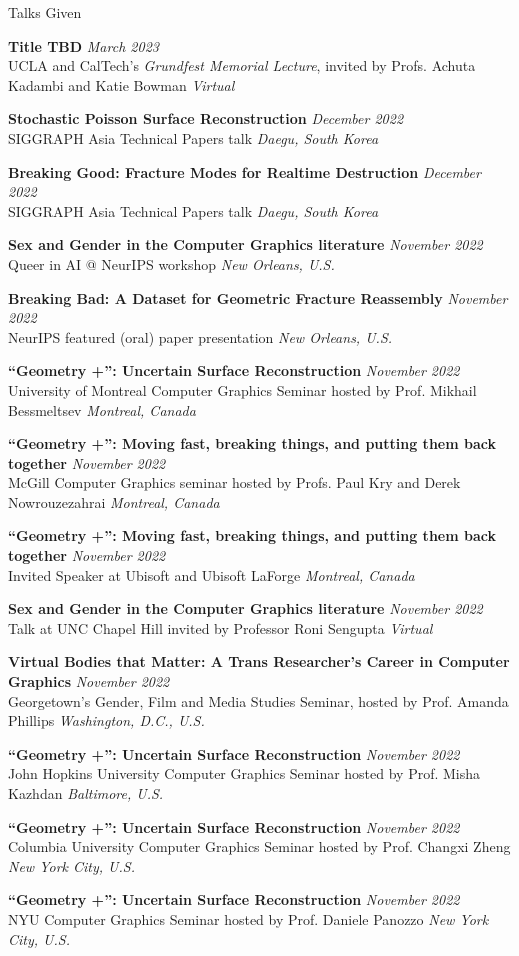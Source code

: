 \documentclass{resume}
\newcommand{\talk}[4]{
    {\bf #1} \hfill {\em \small #2} \\ %
    {\small #3} \hfill {\em \small #4}
}
\begin{document}
\begin{rSection}{Talks Given}

\talk{Title TBD}{March 2023}{UCLA and CalTech's \textit{Grundfest Memorial Lecture}, invited by Profs. Achuta Kadambi and Katie Bowman}{Virtual}

\talk{Stochastic Poisson Surface Reconstruction}{December 2022}{SIGGRAPH Asia Technical Papers talk}{Daegu, South Korea}

\talk{Breaking Good: Fracture Modes for Realtime Destruction}{December 2022}{SIGGRAPH Asia Technical Papers talk}{Daegu, South Korea}

\talk{Sex and Gender in the Computer Graphics literature}{November 2022}{Queer in AI @ NeurIPS workshop}{New Orleans, U.S.}

\talk{Breaking Bad: A Dataset for Geometric Fracture Reassembly}{November 2022}{NeurIPS featured (oral) paper presentation}{New Orleans, U.S.}

\talk{``Geometry +'': Uncertain Surface Reconstruction}{November 2022}{University of Montreal Computer Graphics Seminar hosted by Prof. Mikhail Bessmeltsev}{Montreal, Canada}

\talk{``Geometry +'': Moving fast, breaking things, and putting them back together}{November 2022}{McGill Computer Graphics seminar hosted by Profs. Paul Kry and Derek Nowrouzezahrai}{Montreal, Canada}

\talk{``Geometry +'': Moving fast, breaking things, and putting them back together}{November 2022}{Invited Speaker at Ubisoft and Ubisoft LaForge}{Montreal, Canada}

\talk{Sex and Gender in the Computer Graphics literature}{November 2022}{Talk at UNC Chapel Hill invited by Professor Roni Sengupta}{Virtual}

\talk{Virtual Bodies that Matter: A Trans Researcher’s Career in Computer Graphics}{November 2022}{Georgetown's Gender, Film and Media Studies Seminar, hosted by Prof. Amanda Phillips}{Washington, D.C., U.S.}

\talk{``Geometry +'': Uncertain Surface Reconstruction}{November 2022}{John Hopkins University Computer Graphics Seminar hosted by Prof. Misha Kazhdan}{Baltimore, U.S.}

\talk{``Geometry +'': Uncertain Surface Reconstruction}{November 2022}{Columbia University Computer Graphics Seminar hosted by Prof. Changxi Zheng}{New York City, U.S.}

\talk{``Geometry +'': Uncertain Surface Reconstruction}{November 2022}{NYU Computer Graphics Seminar hosted by Prof. Daniele Panozzo}{New York City, U.S.}


\end{rSection}
\end{document}
